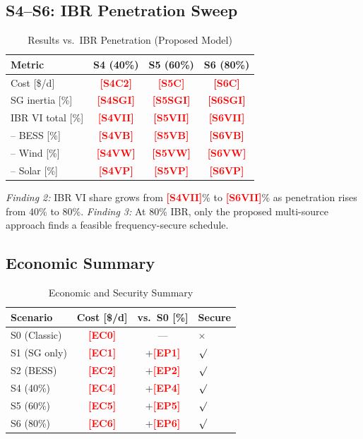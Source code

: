 \documentclass[journal]{IEEEtran}
\newcommand{\RESULT}[1]{\textcolor{red}{\textbf{[#1]}}}
\begin{document}
\subsection{S4--S6: IBR Penetration Sweep}
\begin{table}[!t]\renewcommand{\arraystretch}{1.2}
\caption{Results vs.\ IBR Penetration (Proposed Model)}
\label{tab:sweep}\centering\footnotesize
\begin{tabular}{lccc}\toprule
Metric&S4 (40\%)&S5 (60\%)&S6 (80\%)\\\midrule
Cost [\$/d]&\RESULT{S4C2}&\RESULT{S5C}&\RESULT{S6C}\\
SG inertia [\%]&\RESULT{S4SGI}&\RESULT{S5SGI}&\RESULT{S6SGI}\\
IBR VI total [\%]&\RESULT{S4VII}&\RESULT{S5VII}&\RESULT{S6VII}\\
-- BESS [\%]&\RESULT{S4VB}&\RESULT{S5VB}&\RESULT{S6VB}\\
-- Wind [\%]&\RESULT{S4VW}&\RESULT{S5VW}&\RESULT{S6VW}\\
-- Solar [\%]&\RESULT{S4VP}&\RESULT{S5VP}&\RESULT{S6VP}\\
\bottomrule\end{tabular}\end{table}

\textit{Finding 2:} IBR VI share grows from
\RESULT{S4VII}\% to \RESULT{S6VII}\% as penetration
rises from 40\% to 80\%.
\textit{Finding 3:} At 80\% IBR, only the proposed
multi-source approach finds a feasible frequency-secure
schedule.

\subsection{Economic Summary}
\begin{table}[!t]\renewcommand{\arraystretch}{1.2}
\caption{Economic and Security Summary}
\label{tab:economic}\centering\footnotesize
\begin{tabular}{lccl}\toprule
Scenario&Cost [\$/d]&vs.\ S0 [\%]&Secure\\\midrule
S0 (Classic)&\RESULT{EC0}&---&$\times$\\
S1 (SG only)&\RESULT{EC1}&+\RESULT{EP1}&$\surd$\\
S2 (BESS)   &\RESULT{EC2}&+\RESULT{EP2}&$\surd$\\
S4 (40\%)   &\RESULT{EC4}&+\RESULT{EP4}&$\surd$\\
S5 (60\%)   &\RESULT{EC5}&+\RESULT{EP5}&$\surd$\\
S6 (80\%)   &\RESULT{EC6}&+\RESULT{EP6}&$\surd$\\
\bottomrule\end{tabular}\end{table}
\end{document}
